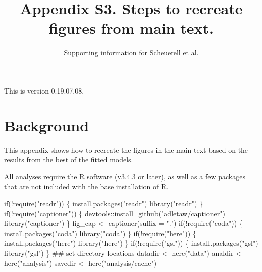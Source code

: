 \documentclass[11pt,]{article}
\title{Appendix S3. Steps to recreate figures from main text.}
\subtitle{Supporting information for Scheuerell et al.}
\author{}
\date{}
\newenvironment{Shaded}{}{}
\newcommand{\CommentTok}[1]{\textcolor[rgb]{0.00,0.50,0.00}{#1}}
\newcommand{\ControlFlowTok}[1]{\textcolor[rgb]{0.00,0.00,1.00}{#1}}
\newcommand{\DataTypeTok}[1]{#1}
\newcommand{\KeywordTok}[1]{\textcolor[rgb]{0.00,0.00,1.00}{#1}}
\newcommand{\NormalTok}[1]{#1}
\newcommand{\OperatorTok}[1]{#1}
\newcommand{\StringTok}[1]{\textcolor[rgb]{0.00,0.50,0.50}{#1}}
\begin{document}
\maketitle

{
\setcounter{tocdepth}{3}
\tableofcontents
}
\vspace{0.2in}

This is version 0.19.07.08.

\hypertarget{background}{%
\section{Background}\label{background}}

This appendix shows how to recreate the figures in the main text based
on the results from the best of the fitted models.

All analyses require the \href{https://cran.r-project.org/}{R software}
(v3.4.3 or later), as well as a few packages that are not included with
the base installation of R.

\begin{Shaded}
\begin{Highlighting}[]
\ControlFlowTok{if}\NormalTok{(}\OperatorTok{!}\KeywordTok{require}\NormalTok{(}\StringTok{"readr"}\NormalTok{)) \{}
  \KeywordTok{install.packages}\NormalTok{(}\StringTok{"readr"}\NormalTok{)}
  \KeywordTok{library}\NormalTok{(}\StringTok{"readr"}\NormalTok{)}
\NormalTok{\}}
\ControlFlowTok{if}\NormalTok{(}\OperatorTok{!}\KeywordTok{require}\NormalTok{(}\StringTok{"captioner"}\NormalTok{)) \{}
\NormalTok{  devtools}\OperatorTok{::}\KeywordTok{install_github}\NormalTok{(}\StringTok{"adletaw/captioner"}\NormalTok{)}
  \KeywordTok{library}\NormalTok{(}\StringTok{"captioner"}\NormalTok{)}
\NormalTok{\}}
\NormalTok{fig_cap <-}\StringTok{ }\KeywordTok{captioner}\NormalTok{(}\DataTypeTok{suffix =} \StringTok{"."}\NormalTok{)}
\ControlFlowTok{if}\NormalTok{(}\OperatorTok{!}\KeywordTok{require}\NormalTok{(}\StringTok{"coda"}\NormalTok{)) \{}
  \KeywordTok{install.packages}\NormalTok{(}\StringTok{"coda"}\NormalTok{)}
  \KeywordTok{library}\NormalTok{(}\StringTok{"coda"}\NormalTok{)}
\NormalTok{\}}
\ControlFlowTok{if}\NormalTok{(}\OperatorTok{!}\KeywordTok{require}\NormalTok{(}\StringTok{"here"}\NormalTok{)) \{}
  \KeywordTok{install.packages}\NormalTok{(}\StringTok{"here"}\NormalTok{)}
  \KeywordTok{library}\NormalTok{(}\StringTok{"here"}\NormalTok{)}
\NormalTok{\}}
\ControlFlowTok{if}\NormalTok{(}\OperatorTok{!}\KeywordTok{require}\NormalTok{(}\StringTok{"gsl"}\NormalTok{)) \{}
  \KeywordTok{install.packages}\NormalTok{(}\StringTok{"gsl"}\NormalTok{)}
  \KeywordTok{library}\NormalTok{(}\StringTok{"gsl"}\NormalTok{)}
\NormalTok{\}}
\CommentTok{## set directory locations}
\NormalTok{datadir <-}\StringTok{ }\KeywordTok{here}\NormalTok{(}\StringTok{"data"}\NormalTok{)}
\NormalTok{analdir <-}\StringTok{ }\KeywordTok{here}\NormalTok{(}\StringTok{"analysis"}\NormalTok{)}
\NormalTok{savedir <-}\StringTok{ }\KeywordTok{here}\NormalTok{(}\StringTok{"analysis/cache"}\NormalTok{)}
\end{Highlighting}
\end{Shaded}
\end{document}
